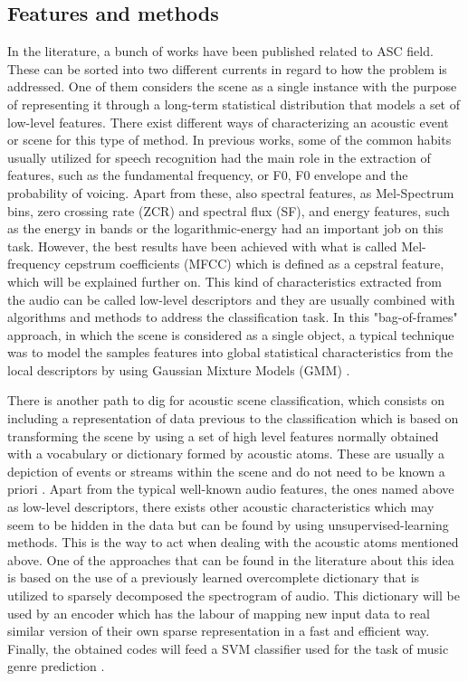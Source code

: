 \subsection{Features and methods}
In the literature, a bunch of works have been published related to ASC field. These can be sorted into two different currents in regard to how the problem is addressed. One of them considers the scene as a single instance with the purpose of representing it through a long-term statistical distribution that models a set of low-level features\cite{Stowell2015}. There exist different ways of characterizing an acoustic event or scene for this type of method. In previous works, some of the common habits usually utilized for speech recognition had the main role in the extraction of features, such as the fundamental frequency, or F0, F0 envelope and the probability of voicing. Apart from these, also spectral features, as Mel-Spectrum bins, zero crossing rate (ZCR) and spectral flux (SF), and energy features, such as the energy in bands or the logarithmic-energy \cite{Geiger2013} had an important job on this task. However, the best results have been achieved with what is called Mel-frequency cepstrum coefficients (MFCC) which is defined as a cepstral feature, which will be explained further on. This kind of characteristics extracted from the audio can be called low-level descriptors and they are usually combined with algorithms and methods to address the classification task. In this "bag-of-frames" approach, in which the scene is considered as a single object, a typical technique was to model the samples features into global statistical characteristics from the local descriptors by using Gaussian Mixture Models (GMM) \cite{Aucouturier2007}.

There is another path to dig for acoustic scene classification, which consists on including a representation of data previous to the classification which is based on transforming the scene by using a set of high level features normally obtained with a vocabulary or dictionary formed by acoustic atoms. These are usually a depiction of events or streams within the scene and do not need to be known a priori \cite{Stowell2015}. Apart from the typical well-known audio features, the ones named above as low-level descriptors, there exists other acoustic characteristics which may seem to be hidden in the data but can be found by using unsupervised-learning methods. This is the way to act when dealing with the acoustic atoms mentioned above. 
One of the approaches that can be found in the literature about this idea is based on the use of a previously learned overcomplete dictionary that is utilized to sparsely decomposed the spectrogram of audio. This dictionary will be used by an encoder which has the labour of mapping new input data to real similar version of their own sparse representation in a fast and efficient way. Finally, the obtained codes will feed a SVM classifier used for the task of music genre prediction \cite{Henaff2011}. 

